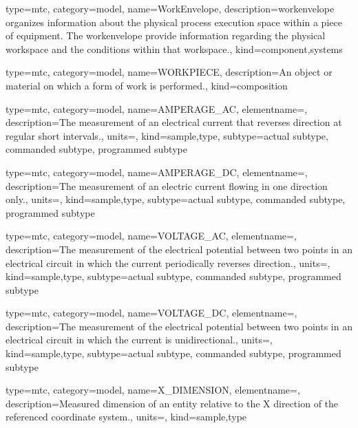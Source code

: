 {
  type=mtc,
  category=model,
  name={WorkEnvelope},
  description={\gls{workenvelope} organizes information about the physical process execution space within a piece of equipment. The \gls{workenvelope} \MAY provide information regarding the physical workspace and the conditions within that workspace.},
  kind={component,systems}
}


{
  type=mtc,
  category=model,
  name={WORKPIECE},
  description={An object or material on which a form of work is performed.},
  kind={composition}
}


{
  type=mtc,
  category=model,
  name={AMPERAGE\_AC},
  elementname=,
  description={The measurement of an electrical current that reverses direction at regular short intervals.},
  units=,
  kind={sample,type},
  subtype={\gls{actual subtype}, \gls{commanded subtype}, \gls{programmed subtype}}
}


{
  type=mtc,
  category=model,
  name={AMPERAGE\_DC},
  elementname=,
  description={The measurement of an electric current flowing in one direction only.},
  units=,
  kind={sample,type},
  subtype={\gls{actual subtype}, \gls{commanded subtype}, \gls{programmed subtype}}
}


{
  type=mtc,
  category=model,
  name={VOLTAGE\_AC},
  elementname=,
  description={The measurement of the electrical potential between two points in an electrical circuit in which the current periodically reverses direction.},
  units=,
  kind={sample,type},
  subtype={\gls{actual subtype}, \gls{commanded subtype}, \gls{programmed subtype}}
}


{
  type=mtc,
  category=model,
  name={VOLTAGE\_DC},
  elementname=,
  description={The measurement of the electrical potential between two points in an electrical circuit in which the current is unidirectional.},
  units=,
  kind={sample,type},
  subtype={\gls{actual subtype}, \gls{commanded subtype}, \gls{programmed subtype}}
}


{
  type=mtc,
  category=model,
  name={X\_DIMENSION},
  elementname=,
  description={Measured dimension of an entity relative to the X direction of the referenced coordinate system.},
  units=,
  kind={sample,type}
}


